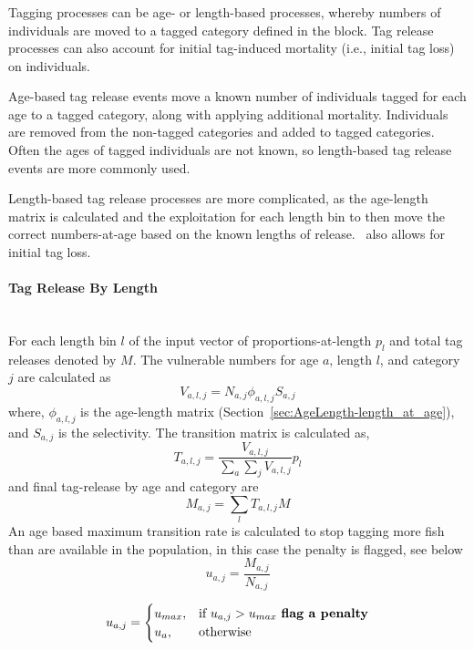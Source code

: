 \subsubsection{}\label{sec:Process-TagByAge}\label{sec:Process-TagByLength} 

Tagging processes can be age- or length-based processes, whereby numbers of individuals are moved to a tagged category defined in the  block. Tag release processes can also account for initial tag-induced mortality (i.e., initial tag loss) on individuals.

Age-based tag release events move a known number of individuals tagged for each age to a tagged category, along with applying additional mortality. Individuals are removed from the non-tagged categories and added to tagged categories. Often the ages of tagged individuals are not known, so length-based tag release events are more commonly used.

Length-based tag release processes are more complicated, as the age-length matrix is calculated and the exploitation for each length bin to then move the correct numbers-at-age based on the known lengths of release. \CNAME\ also allows for initial tag loss.

\paragraph*{{Tag Release By Length}}
\\

For each length bin $l$ of the input vector of proportions-at-length ${p}_l$ and total tag releases denoted by \(M\). The vulnerable numbers for age \(a\), length \(l\), and category \(j\) are calculated as
$$V_{a,l,j} = N_{a,j} \phi_{a,l,j} S_{a,j}$$
where, \(\phi_{a,l,j}\) is the age-length matrix (Section~\ref{sec:AgeLength-length_at_age}), and \(S_{a,j}\) is the selectivity. The transition matrix is calculated as,
$$ T_{a,l,j}= \frac{V_{a,l,j}}{\sum_a\sum_j V_{a,l,j}} {p}_l$$
and final tag-release by age and category are
$$ M_{a,j} = \sum_l T_{a,l,j}M  $$
An age based maximum transition rate is calculated to stop tagging more fish than are available in the population, in this case the penalty is flagged, see below
$$ u_{a,j} = \frac{ M_{a,j} }{N_{a,j} }  $$

$$
u_{a,j} =
\begin{cases}
u_{max},& \text{if } u_{a,j} > u_{max} \text{ \textbf{flag a penalty}}\\
u_{a},  & \text{otherwise}
\end{cases}
$$

